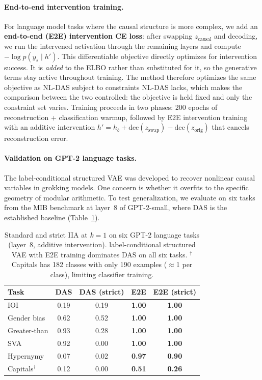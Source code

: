 \documentclass{article}
\begin{document}
\paragraph{End-to-end intervention training.}
For language model tasks where the causal structure is more complex, we add an
\textbf{end-to-end (E2E) intervention CE loss}: after swapping $z_\text{causal}$
and decoding, we run the intervened activation through the remaining layers and
compute $-\log p(y_s \mid h')$. This differentiable objective directly
optimizes for intervention success. It is \emph{added} to the ELBO rather than
substituted for it, so the generative terms stay active throughout training. The
method therefore optimizes the same objective as NL-DAS subject to constraints
NL-DAS lacks, which makes the comparison between the two controlled: the
objective is held fixed and only the constraint set varies. Training proceeds in two phases: 200 epochs of reconstruction +
classification warmup, followed by E2E intervention training with an additive
intervention $h' = h_b + \text{dec}(z_\text{swap}) - \text{dec}(z_\text{orig})$
that cancels reconstruction error.

\paragraph{Validation on GPT-2 language tasks.}
The label-conditional structured VAE was developed to recover nonlinear causal variables in
grokking models. One concern is whether it overfits to the specific
geometry of modular arithmetic. To test generalization, we evaluate on six
tasks from the MIB benchmark \citep{mueller2025mib} at layer~8 of GPT-2-small,
where DAS is the established baseline (Table~\ref{tab:nlp_results}).

\begin{table}[t]
\centering
\small
\setlength{\tabcolsep}{4pt}
\begin{tabular}{lcccc}
\toprule
\textbf{Task} & \textbf{DAS} & \textbf{DAS (strict)} & \textbf{E2E} & \textbf{E2E (strict)} \\
\midrule
IOI            & 0.19 & 0.19 & \textbf{1.00} & \textbf{1.00} \\
Gender bias    & 0.62 & 0.52 & \textbf{1.00} & \textbf{1.00} \\
Greater-than   & 0.93 & 0.28 & \textbf{1.00} & \textbf{1.00} \\
SVA            & 0.92 & 0.00 & \textbf{1.00} & \textbf{1.00} \\
Hypernymy      & 0.07 & 0.02 & \textbf{0.97} & \textbf{0.90} \\
Capitals$^\dagger$ & 0.12 & 0.00 & \textbf{0.51} & \textbf{0.26} \\
\bottomrule
\end{tabular}
\caption{Standard and strict IIA at $k{=}1$ on six GPT-2 language tasks
(layer~8, additive intervention). label-conditional structured VAE with E2E training
dominates DAS on all six tasks. $^\dagger$Capitals has 182 classes with
only 190 examples ($\approx$1 per class), limiting classifier training.}
\label{tab:nlp_results}
\end{table}
\end{document}
